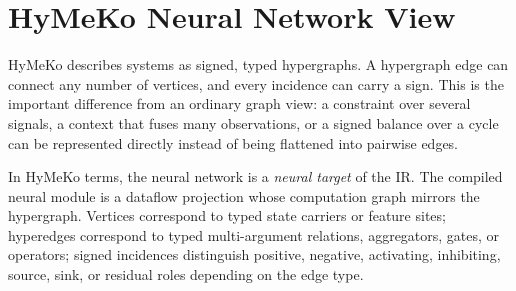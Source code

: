 \documentclass[11pt]{article}
\begin{document}
\begin{center}
\end{center}

\section{HyMeKo Neural Network View}

HyMeKo describes systems as signed, typed hypergraphs. A hypergraph edge can
connect any number of vertices, and every incidence can carry a sign. This is
the important difference from an ordinary graph view: a constraint over several
signals, a context that fuses many observations, or a signed balance over a
cycle can be represented directly instead of being flattened into pairwise
edges.

In HyMeKo terms, the neural network is a \emph{neural target} of the IR. The
compiled neural module is a dataflow projection whose computation graph mirrors
the hypergraph. Vertices correspond to typed state carriers or feature sites;
hyperedges correspond to typed multi-argument relations, aggregators, gates, or
operators; signed incidences distinguish positive, negative, activating,
inhibiting, source, sink, or residual roles depending on the edge type.
\end{document}
